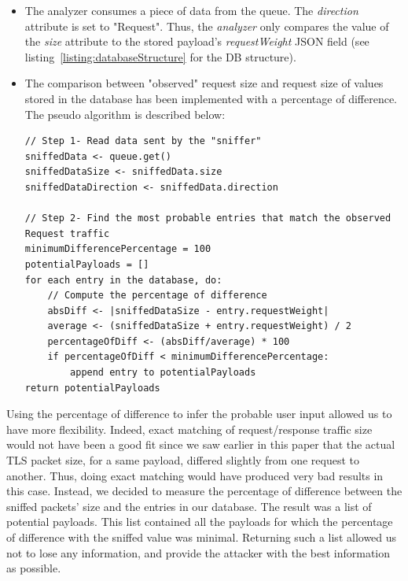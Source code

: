 \documentclass[runningheads]{llncs}
\begin{document}
\begin{itemize}
\item The analyzer consumes a piece of data from the queue. The \emph{direction} attribute is set to "Request". Thus, the \emph{analyzer} only compares the value of the \emph{size} attribute to the stored payload's \emph{requestWeight} JSON field (see listing~\ref{listing:databaseStructure} for the DB structure).
\item The comparison between "observed" request size and request size of values stored in the database has been implemented with a percentage of difference. The pseudo algorithm is described below:
\begin{lstlisting}[caption=Pseudo algorithm to infer user input during a Request, label={listing:inferenceRequest}]
// Step 1- Read data sent by the "sniffer"
sniffedData <- queue.get()
sniffedDataSize <- sniffedData.size
sniffedDataDirection <- sniffedData.direction

// Step 2- Find the most probable entries that match the observed Request traffic
minimumDifferencePercentage = 100
potentialPayloads = []
for each entry in the database, do:
	// Compute the percentage of difference
    absDiff <- |sniffedDataSize - entry.requestWeight|
    average <- (sniffedDataSize + entry.requestWeight) / 2
    percentageOfDiff <- (absDiff/average) * 100
    if percentageOfDiff < minimumDifferencePercentage:
    	append entry to potentialPayloads
return potentialPayloads
\end{lstlisting}
\end{itemize}

Using the percentage of difference to infer the probable user input allowed us to have more flexibility. Indeed, exact matching of request/response traffic size would not have been a good fit since we saw earlier in this paper that the actual TLS packet size, for a same payload, differed slightly from one request to another. Thus, doing exact matching would have produced very bad results in this case. Instead, we decided to measure the percentage of difference between the sniffed packets' size and the entries in our database. The result was a list of potential payloads. This list contained all the payloads for which the percentage of difference with the sniffed value was minimal. Returning such a list allowed us not to lose any information, and provide the attacker with the best information as possible.
\end{document}
